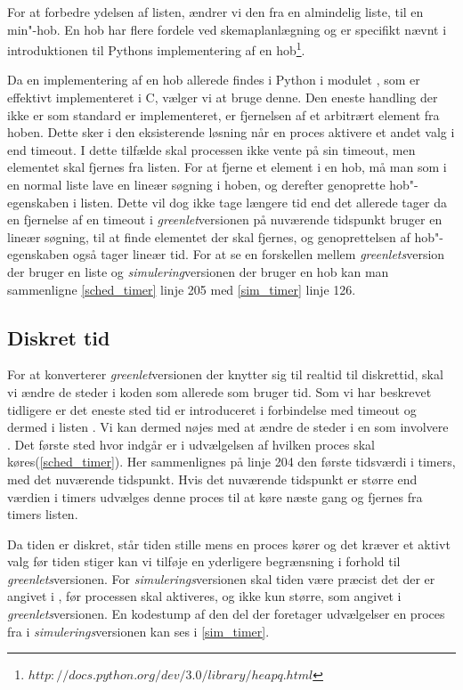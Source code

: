 For at forbedre ydelsen af  listen, 
ændrer vi den fra en almindelig liste, til en min"-hob. En hob har
flere fordele ved skemaplanlægning og er specifikt nævnt i introduktionen til Pythons implementering af en hob\footnote{$http://docs.python.org/dev/3.0/library/heapq.html$}. 

Da en implementering af en hob
allerede findes i Python i modulet , som er effektivt implementeret i C, vælger vi at bruge denne. Den eneste handling
der ikke er som standard er implementeret, er fjernelsen af et arbitrært element
fra hoben. Dette sker i den eksisterende løsning når en proces
aktivere et andet valg i  end timeout. I dette tilfælde skal
processen ikke vente på sin timeout, men elementet skal fjernes fra
 listen. For at fjerne et element i en hob, må man som i
en normal liste lave en lineær søgning i hoben, og derefter genoprette
hob"-egenskaben i listen. Dette vil dog ikke tage længere tid end det
allerede tager da en fjernelse af en timeout i \emph{greenlet}versionen på nuværende
tidspunkt bruger en lineær søgning, til at finde elementet der skal
fjernes, og genoprettelsen af hob"-egenskaben også tager lineær tid. For at se en forskellen mellem \emph{greenlets}version der bruger en liste og \emph{simulering}versionen der bruger en hob kan man sammenligne \cref{sched_timer} linje 205 med \cref{sim_timer} linje 126. 

\subsection{Diskret tid} 
For at konverterer \emph{greenlet}versionen der knytter sig til realtid til diskrettid, skal vi ændre de steder i koden som allerede som bruger tid. Som vi har beskrevet tidligere er det eneste sted tid er introduceret i forbindelse med timeout og dermed i listen . Vi kan dermed nøjes med at ændre de steder i \sched en som involvere . Det første sted hvor  indgår er i udvælgelsen af hvilken proces skal køres(\cref{sched_timer}). Her sammenlignes på linje 204  den første tidsværdi i timers, med det nuværende tidspunkt. Hvis det nuværende tidspunkt er større end værdien i timers udvælges denne proces til at køre næste gang og fjernes fra timers listen.

Da tiden er diskret, står tiden stille mens en proces kører og det kræver et aktivt valg før tiden stiger kan vi tilføje en yderligere begrænsning i forhold til \emph{greenlets}versionen. For \emph{simulerings}versionen skal tiden være præcist det der er angivet i , før processen skal aktiveres, og ikke kun større, som angivet i \emph{greenlets}versionen. En kodestump af den del der foretager udvælgelser en proces fra  i \emph{simulerings}versionen  kan ses i \cref{sim_timer}. 

